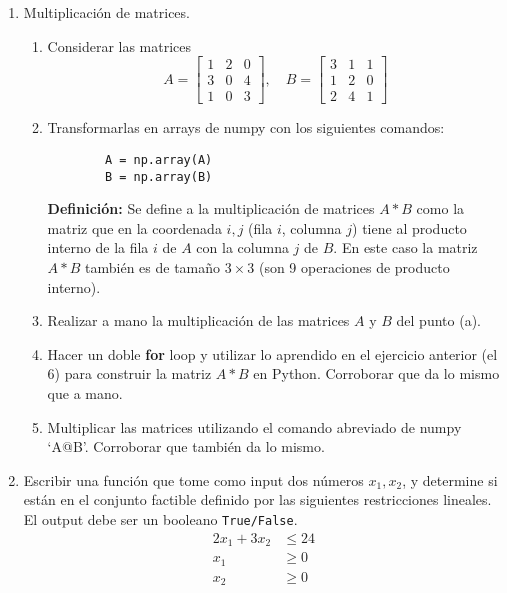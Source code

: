 \documentclass[12pt]{article}
\begin{document}
\begin{enumerate}
    \item Multiplicación de matrices.
    \begin{enumerate}[label=\alph*)]
        \item Considerar las matrices
        \[
        A = \begin{bmatrix}
        1 & 2 & 0\\[4pt]
        3 & 0 & 4\\[4pt]
        1 & 0 & 3
        \end{bmatrix}, \quad
        B = \begin{bmatrix}
        3 & 1 & 1\\[4pt]
        1 & 2 & 0\\[4pt]
        2 & 4 & 1
        \end{bmatrix}
        \]
        \item Transformarlas en arrays de numpy con los siguientes comandos:
        \begin{lstlisting}
        A = np.array(A)
        B = np.array(B)
        \end{lstlisting}
        \textbf{Definición:} Se define a la multiplicación de matrices $A*B$ como la matriz que en la coordenada $i,j$ (fila $i$, columna $j$) tiene al producto interno de la fila $i$ de $A$ con la columna $j$ de $B$. En este caso la matriz $A*B$ también es de tamaño $3 \times 3$ (son 9 operaciones de producto interno).
        \item Realizar a mano la multiplicación de las matrices $A$ y $B$ del punto (a).
        \item Hacer un doble \textbf{for} loop y utilizar lo aprendido en el ejercicio anterior (el 6) para construir la matriz $A*B$ en Python. Corroborar que da lo mismo que a mano.
        \item Multiplicar las matrices utilizando el comando abreviado de numpy `A@B'. Corroborar que también da lo mismo.
    \end{enumerate}
    
    \item Escribir una función que tome como input dos números $x_1, x_2$, y determine si están en el conjunto factible definido por las siguientes restricciones lineales. El output debe ser un booleano \texttt{True/False}.\\[0.5em]
    \[
    \begin{aligned}
        2x_1 + 3x_2 &\leq 24 \\
        x_1 &\geq 0 \\
        x_2 &\geq 0
        \end{aligned}
    \]


\end{enumerate}
\end{document}

